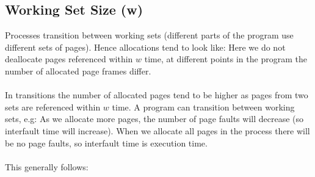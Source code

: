 \documentclass{report}
\begin{document}
\subsection*{Working Set Size (w)}
Processes transition between working sets (different parts of the program use different sets of pages). Hence allocations tend to look like:
Here we do not deallocate pages referenced within $w$ time, at different points in the program the number of allocated page frames differ.
\\
\\ In transitions the number of allocated pages tend to be higher as pages from two sets are referenced within $w$ time.
A program can transition between working sets, e.g:
As we allocate more pages, the number of page faults will decrease (so interfault time will increase). When we allocate all pages in the process there will be no page faults, so interfault time is execution time.
\\
\\ This generally follows:
\end{document}
